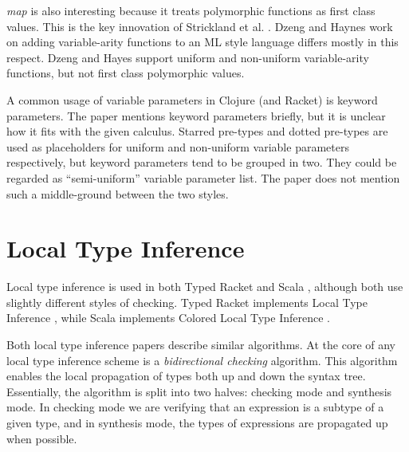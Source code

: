 \documentclass[12pt, a4paper]{article}
\begin{document}
\emph{map} is also interesting because it treats polymorphic functions as first
class values. This is the key innovation of Strickland et al. . Dzeng and Haynes
\cite{Dzeng94typereconstruction} work on adding variable-arity functions to
an ML style language differs mostly in this respect. Dzeng and Hayes support uniform and
non-uniform variable-arity functions, but not first class polymorphic values.  \footnotemark


A common usage of variable parameters in Clojure (and Racket) is keyword
parameters. The paper \cite {Strickland:2009:PVP:1532974.1532978}
mentions keyword parameters briefly, but it is unclear how it fits
with the given calculus. Starred pre-types and dotted pre-types are used
as placeholders for uniform and non-uniform variable parameters respectively, but
keyword parameters tend to be grouped in two. They could be regarded as ``semi-uniform''
variable parameter list. The paper does not mention such a middle-ground 
between the two styles.

\section{Local Type Inference}

Local type inference is used in both Typed Racket 
\cite{Tobin-Hochstadt:2008:DIT:1328897.1328486}
and Scala \cite{Odersky06anoverview}, although both use slightly different
styles of checking. Typed Racket implements Local Type Inference
\cite{Pierce:2000:LTI:345099.345100},
while Scala implements Colored Local Type Inference \cite{Odersky:2001:CLT:373243.360207}.

Both local type inference papers describe similar algorithms. At the core
of any local type inference scheme is a \emph{bidirectional checking}
algorithm. This algorithm enables the local propagation of types both
up and down the syntax tree. Essentially, the algorithm is split into two
halves: checking mode and synthesis mode. In checking mode we are verifying
that an expression is a subtype of a given type, and in synthesis mode, the
types of expressions are propagated up when possible.
\end{document}

